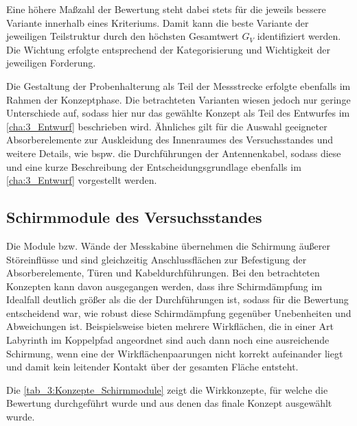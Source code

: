 Eine höhere Maßzahl der Bewertung steht dabei stets für die jeweils bessere Variante innerhalb eines Kriteriums. Damit kann die beste Variante der jeweiligen Teilstruktur durch den höchsten Gesamtwert $G_V$ identifiziert werden. Die Wichtung erfolgte entsprechend der Kategorisierung und Wichtigkeit der jeweiligen Forderung.
\par
\vspace{\linespace}
Die Gestaltung der Probenhalterung als Teil der Messstrecke erfolgte ebenfalls im Rahmen der Konzeptphase. Die betrachteten Varianten wiesen jedoch nur geringe Unterschiede auf, sodass hier nur das gewählte Konzept als Teil des Entwurfes im \Abschnitt\ref{cha:3_Entwurf} beschrieben wird. Ähnliches gilt für die Auswahl geeigneter Absorberelemente zur Auskleidung des Innenraumes des Versuchsstandes und weitere Details, wie bspw. die Durchführungen der Antennenkabel, sodass diese und eine kurze Beschreibung der Entscheidungsgrundlage ebenfalls im \Abschnitt\ref{cha:3_Entwurf} vorgestellt werden.


\subsection{Schirmmodule des Versuchsstandes}\label{cha:3_sub_Schirmmodule_Versuchsstand}

Die Module bzw. Wände der Messkabine übernehmen die Schirmung äußerer Störeinflüsse und sind gleichzeitig Anschlussflächen zur Befestigung der Absorberelemente, Türen und Kabeldurchführungen. Bei den betrachteten Konzepten kann davon ausgegangen werden, dass ihre Schirmdämpfung im Idealfall deutlich größer als die der Durchführungen ist, sodass für die Bewertung entscheidend war, wie robust diese Schirmdämpfung gegenüber Unebenheiten und Abweichungen ist. Beispielsweise bieten mehrere Wirkflächen, die in einer Art Labyrinth im Koppelpfad angeordnet sind auch dann noch eine ausreichende Schirmung, wenn eine der Wirkflächenpaarungen nicht korrekt aufeinander liegt und damit kein leitender Kontakt über der gesamten Fläche entsteht. 
\par
\vspace{\linespace}
Die \Tabelle\ref{tab_3:Konzepte_Schirmmodule} zeigt die Wirkkonzepte, für welche die Bewertung durchgeführt wurde und aus denen das finale Konzept ausgewählt wurde. 


